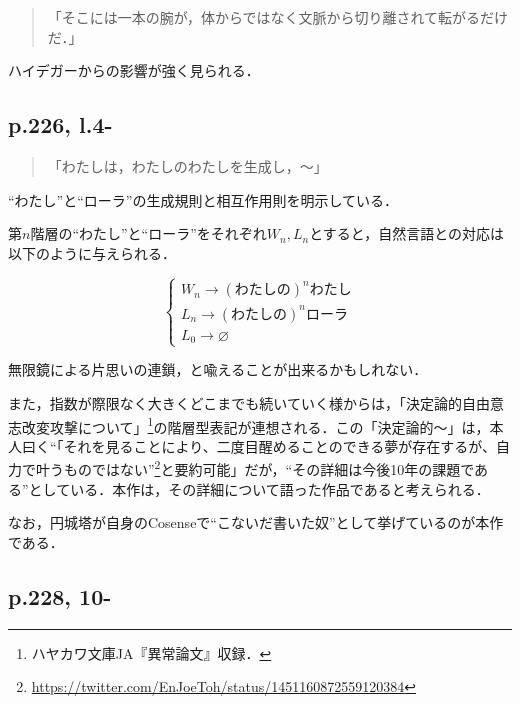 \documentclass[10pt, a5paper, twoside]{jsarticle}
\theoremstyle{definition}
\begin{document}
			\begin{quote}

				「そこには一本の腕が，体からではなく文脈から切り離されて転がるだけだ．」
				
			\end{quote}

			ハイデガーからの影響が強く見られる．

		\subsection{p.226, l.4-}

			\begin{quote}

				「わたしは，わたしのわたしを生成し，〜」
				
			\end{quote}

			“わたし”と“ローラ”の生成規則と相互作用則を明示している．

			第$n$階層の“わたし”と“ローラ”をそれぞれ$W_n, L_n$とすると，自然言語との対応は以下のように与えられる．

			\begin{equation*}
				\begin{cases}
					W_n \to (\text{わたしの})^n \text{わたし} \\ L_n \to (\text{わたしの})^n \text{ローラ} \\ L_0 \to \varnothing
				\end{cases}
			\end{equation*}

			無限鏡による片思いの連鎖，と喩えることが出来るかもしれない．

			また，指数が際限なく大きくどこまでも続いていく様からは，「決定論的自由意志改変攻撃について」\footnote{ハヤカワ文庫JA『異常論文』収録．}の階層型表記が連想される．この「決定論的〜」は，本人曰く“「それを見ることにより、二度目醒めることのできる夢が存在するが、自力で叶うものではない”\footnote{\url{https://twitter.com/EnJoeToh/status/1451160872559120384}}と要約可能」だが，“その詳細は今後10年の課題である”としている．本作は，その詳細について語った作品であると考えられる．

			なお，円城塔が自身のCosense\cite{nkm2}で“こないだ書いた奴”として挙げているのが本作である．

		\subsection{p.228, 10-}
\end{document}
